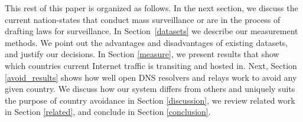 This rest of this paper is organized as follows.  In the next section, we discuss
the current nation-states that conduct mass surveillance or are in the 
process of drafting laws for surveillance.  In
Section~\ref{datasets} we describe our measurement methods.
We point out the advantages and disadvantages of existing datasets, and
justify our decisions.  In Section \ref{measure}, we present results that show which countries
current Internet traffic is transiting and hosted in.  Next, Section
\ref{avoid_results} shows how well open DNS resolvers and relays work to avoid any
given country.  We discuss how our system differs from others and
uniquely suits the purpose of country avoidance in Section
\ref{discussion}, we review related work in Section \ref{related}, and
conclude in Section \ref{conclusion}. 

